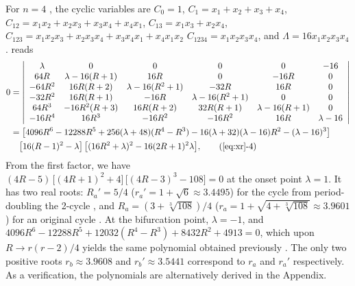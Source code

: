 \documentclass{ws-ijbc}
\begin{document}
For $n = 4$ \cite{stephenson}, the cyclic variables are
$C_0 = 1$,
$C_1 = x_1 + x_2 + x_3 + x_4$,
$C_{12} = x_1 x_2 + x_2 x_3 + x_3 x_4 + x_4 x_1$,
$C_{13} = x_1 x_3 + x_2 x_4$,
$C_{123} = x_1 x_2 x_3 + x_2 x_3 x_4 + x_3 x_4 x_1 + x_4 x_1 x_2$
$C_{1234} = x_1 x_2 x_3 x_4$,
and
$\Lambda = 16 x_1 x_2 x_3 x_4$.
%
 reads
%
\begin{align}
0 & = \left|
\begin{array}{cccccc}
 \lambda  & 0               & 0                 & 0     & 0     & -16 \\
 64 R     & \lambda-16(R+1) & 16 R              & 0     & -16R  & 0 \\
 -64 R^2  & 16R(R+2)        & \lambda-16(R^2+1) & -32 R & 16R   & 0 \\
 -32 R^2  & 16R(R+1)        & -16R              & \lambda-16(R^2+1)  & 0 & 0 \\
 64 R^3   & -16R^2(R+3)     & 16R(R+2)        & 32 R (R+1)       & \lambda-16(R+1) & 0 \\
 -16R^4   & 16R^3           & - 16R^2           & -16R^2            & 16R & \lambda - 16
\end{array}
\right | \nonumber  \\
& =
    \big[
    4096 R^6-12288 R^5 + 256 (\lambda + 48) (R^4- R^3)
      -16 (\lambda + 32)(\lambda - 16) R^2
      -(\lambda - 16)^3 \big]  \nonumber \\
& \quad
    \big[ 16 (R-1)^2 - \lambda \big]
 \, \big[(16 R^2 + \lambda)^2 - 16 (2R+1)^2 \lambda \big],
  \tag{\ref{eq:xr}-4}
\label{eq:xr4}
\end{align}
%
%
%
From the first factor, we have
$ (
    4R - 5
  )
\, \big[
  (4R + 1)^2 + 4
  \big]
\, \big[
  (4R - 3)^3 - 108
  \big] =0$
at the onset point $\lambda = 1$.
%
%
%
It has two real roots:
$R_a' = 5/4$
\big($r_a' = 1+\sqrt{6} \approx 3.4495$\big)
for the cycle from period-doubling the 2-cycle
  ,
and
$R_a = (3+\sqrt[3]{108})/4$
\big($r_a = 1+\sqrt{4+\sqrt[3]{108}} \approx 3.9601$\big)
for an original cycle .
%
At the bifurcation point, $\lambda = -1$, and
$4096 R^6 - 12288 R^5 + 12032 (R^4 - R^3)
  + 8432 R^2 + 4913 = 0$,
which upon $R \rightarrow r(r-2)/4$ yields the same polynomial
obtained previously
\cite{bailey1, kk1, bailey2, lewis}.
%
%
%
The only two positive roots $r_b \approx 3.9608$
and $r_b' \approx 3.5441$
correspond to $r_a$ and $r_a'$ respectively.
%
As a verification, the polynomials are
alternatively derived in the Appendix.
\end{document}
